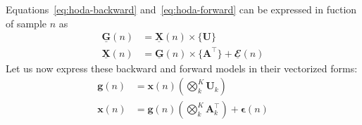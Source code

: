\documentclass[twocolumn]{article}
\newcommand{\ten}[1]{\underline{\mathbf{#1}}} %
\newcommand{\mat}[1]{\mathbf{#1}} %
\renewcommand{\vec}[1]{\mathbf{#1}} %
\newcommand{\mmpr}[1]{\times\{#1\}} %
\begin{document}
Equations~\ref{eq:hoda-backward} and~\ref{eq:hoda-forward} can be expressed in fuction
of sample $n$ as
\begin{subequations}
	\label{eq:proj-n}
	\begin{align}
		\ten{G}(n) & = \ten{X}(n)\mmpr{\mat{U}}
		\label{eq:proj-back-n}                                                   \\
		\ten{X}(n) & = \ten{G}(n)\mmpr{\mat{A}^\intercal}+\ten{\mathbfcal{E}}(n)
		\label{eq:proj-fwd-n}
	\end{align}
\end{subequations}
Let us now express these backward and forward models in their vectorized forms:
\begin{subequations}
	\label{eq:proj-n}
	\begin{align}
		\vec{g}(n) & = \vec{x}(n)\left(\bigotimes_k^K\mat{U}_k\right)
		\label{eq:proj-back-vec}                                                  \\
		\vec{x}(n) & = \vec{g}(n)\left(\bigotimes_k^K\mat{A}_k^\intercal\right) +
		\vec{\boldsymbol\epsilon}(n)
		\label{eq:proj-fwd-vec}
	\end{align}
\end{subequations}
\end{document}
